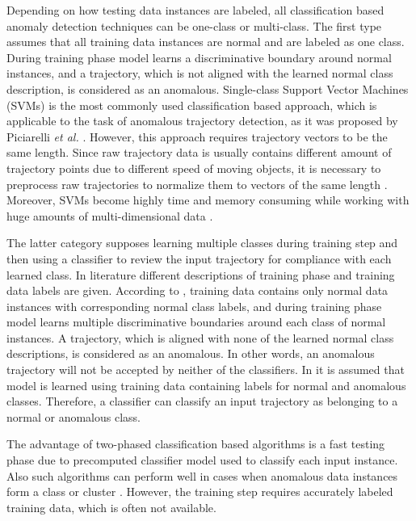 Depending on how testing data instances are labeled, all classification based anomaly detection techniques can be one-class or multi-class. The first type assumes that all training data instances are normal and are labeled as one class. During training phase model learns a discriminative boundary around normal instances, and a trajectory, which is not aligned with the learned normal class description, is considered as an anomalous. Single-class Support Vector Machines (SVMs) is the most commonly used classification based approach, which is applicable to the task of anomalous trajectory detection, as it was proposed by Piciarelli \textit{et al.} \cite{inproceedings:16_va_tad_svm}\cite{article:17_tbaed}. However, this approach requires trajectory vectors to be the same length. Since raw trajectory data is usually contains different amount of trajectory points due to different speed of moving objects, it is necessary to preprocess raw trajectories to normalize them to vectors of the same length \cite{article:17_tbaed}. Moreover, SVMs become highly time and memory consuming while working with huge amounts of multi-dimensional data \cite{article:22_survey_dscc}.

The latter category supposes learning multiple classes during training step and then using a classifier to review the input trajectory for compliance with each learned class. In literature different descriptions of training phase and training data labels are given. According to \cite{article:15_survey_ad}, training data contains only normal data instances with corresponding normal class labels, and during training phase model learns multiple discriminative boundaries around each class of normal instances. A trajectory, which is aligned with none of the learned normal class descriptions, is considered as an anomalous. In other words, an anomalous trajectory will not be accepted by neither of the classifiers. In \cite{article:6_survey_anom_det_rtuvs} it is assumed that model is learned using training data containing labels for normal and anomalous classes. Therefore, a classifier can classify an input trajectory as belonging to a normal or anomalous class.

The advantage of two-phased classification based algorithms is a fast testing phase due to precomputed classifier model used to classify each input instance. Also such algorithms can perform well in cases when anomalous data instances form a class or cluster \cite{inproceedings:18_ardod_lstd}. However, the training step requires accurately labeled training data, which is often not available. 

